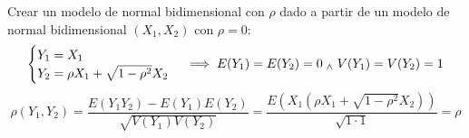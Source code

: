 
Crear un modelo de normal bidimensional con $\rho$ dado a partir de un modelo de normal bidimensional $(X_1, X_2)$ con $\rho = 0$:
\[\begin{cases}
		Y_1 = X_1 \\
		Y_2 = \rho X_1 + \sqrt{1-\rho^2}X_2
	\end{cases} \implies E(Y_1)=E(Y_2) = 0 \; _{\wedge} \; V(Y_1)=V(Y_2) = 1\]
\[\rho(Y_1, Y_2) = \frac{E(Y_1Y_2) - E(Y_1)E(Y_2)}{\sqrt{V(Y_1)V(Y_2)}} = \frac{E(X_1(\rho X_1 + \sqrt{1-\rho^2}X_2))}{\sqrt{1\cdot 1}} = \rho\]